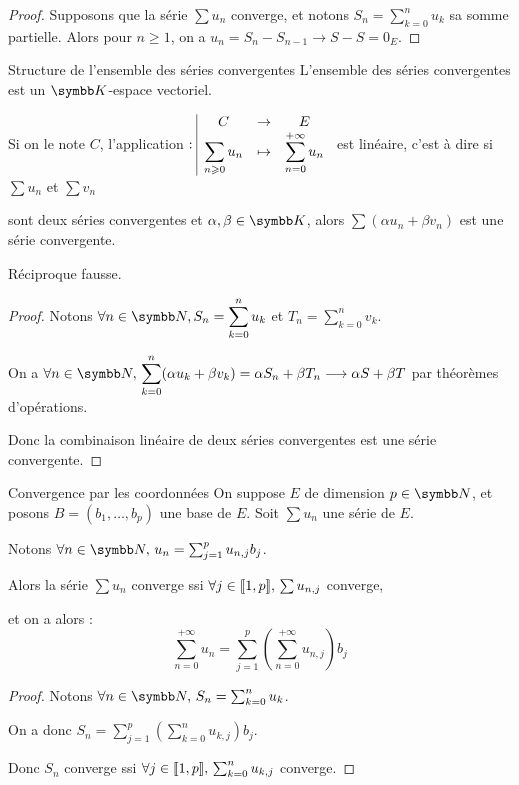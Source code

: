 \begin{proof}
    Supposons que la série $\sum u_n$ converge, et notons $\displaystyle S_n = \sum_{k=0}^n u_k$ sa somme partielle.
    Alors pour $n \geqslant 1$, on a $u_n = S_n - S_{n-1} \longrightarrow S - S = 0_E$.
\end{proof}

\begin{proposition}{Structure de l'ensemble des séries convergentes}{}
    L'ensemble des séries convergentes est un $\K$-espace vectoriel.

    Si on le note $C$, l'application $: \space \begin{array}{|ccc} \displaystyle C & \to & \displaystyle E \\ \displaystyle \sum_{n \geqslant 0} u_n & \mapsto & \displaystyle \sum_{n = 0}^{+\infty} u_n \end{array}$ 
    est linéaire, c'est à dire si $\sum u_n$ et $\sum v_n$
    
    \svspace sont deux séries convergentes et $\alpha, \beta \in \K$, alors $\sum (\alpha u_n + \beta v_n)$ est une série convergente.
\end{proposition}

\begin{remarque}
    Réciproque fausse.
\end{remarque}

\begin{proof}
    Notons $\forall n \in \N, S_n = \displaystyle \sum_{k=0}^n u_k$ et $T_n = \displaystyle \sum_{k=0}^n v_k$.

    On a $\displaystyle \forall n \in \N, \, \sum_{k=0}^n (\alpha u_k + \beta v_k) = \alpha S_n + \beta T_n \longrightarrow \alpha S + \beta T$
    par théorèmes d'opérations. 

    Donc la combinaison linéaire de deux séries convergentes est une série convergente.
\end{proof}

\begin{proposition}{Convergence par les coordonnées}{}
    On suppose $E$ de dimension $p \in \N$, et posons $B = (b_1, \ldots, b_p)$ une base de $E$.
    Soit $\sum u_n$ une série de $E$. 

    Notons $\forall n \in \N, \, u_n = \sum_{j = 1 }^p u_{n,j} b_j$. 

    Alors la série $\sum u_n$ converge ssi $\forall j \in [\![1, p]\!], \, \sum u_{n,j}$ converge, 

    et on a alors :
    \[\sum_{n = 0}^{+\infty} u_n = \sum_{j = 1}^p \left( \sum_{n = 0}^{+\infty} u_{n,j} \right) b_j\]
\end{proposition}

\begin{proof}
    Notons $\forall n \in \N, \, S_n = \sum_{k=0}^n u_k$. 

    On a donc $\displaystyle S_n = \sum_{j=1}^p \left( \sum_{k = 0}^{n} u_{k, j} \right) b_j$. 

    Donc $S_n$ converge ssi $\forall j \in [\![1, p]\!], \, \sum_{k=0}^n u_{k, j}$ converge.
\end{proof}

